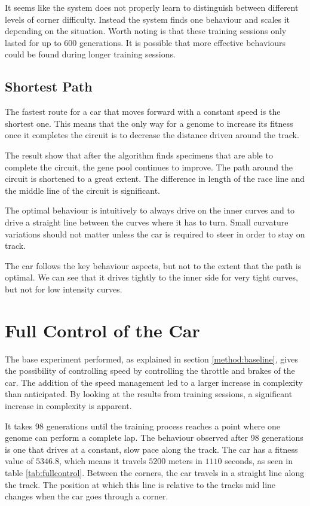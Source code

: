 It seems like the system does not properly learn to distinguish between different levels of corner difficulty. Instead the system finds one behaviour and scales it depending on the situation. Worth noting is that these training sessions only lasted for up to $600$ generations. It is possible that more effective behaviours could be found during longer training sessions. 

\subsection{Shortest Path}
\label{sec:shortest}
The fastest route for a car that moves forward with a constant speed is the shortest one. This means that the only way for a genome to increase its fitness once it completes the circuit is to decrease the distance driven around the track.  

The result show that after the algorithm finds specimens that are able to complete the circuit, the gene pool continues to improve. The path around the circuit is shortened to a great extent. The difference in length of the race line and the middle line of the circuit is significant. 

The optimal behaviour is intuitively to always drive on the inner curves and to drive a straight line between the curves where it has to turn. Small curvature variations should not matter unless the car is required to steer in order to stay on track. 

The car follows the key behaviour aspects, but not to the extent that the path is optimal. We can see that it drives tightly to the inner side for very tight curves, but not for low intensity curves.


\section{Full Control of the Car}
\label{result:fullcontrol}
The base experiment performed, as explained in section \ref{method:baseline}, gives the possibility of controlling speed by controlling the throttle and brakes of the car. The addition of the speed management led to a larger increase in complexity than anticipated. By looking at the results from training sessions, a significant increase in complexity is apparent.

It takes 98 generations until the training process reaches a point where one genome can perform a complete lap. The behaviour observed after 98 generations is one that drives at a constant, slow pace along the track. The car has a fitness value of $5346.8$, which means it travels $5200$ meters in $1110$ seconds, as seen in table \ref{tab:fullcontrol}. Between the corners, the car travels in a straight line along the track. The position at which this line is relative to the tracks mid line changes when the car goes through a corner.

